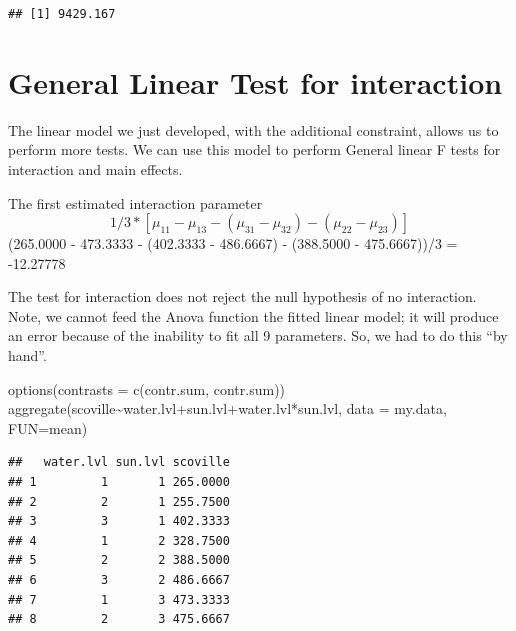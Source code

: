\documentclass[
]{book}
\newenvironment{Shaded}{\begin{snugshade}}{\end{snugshade}}
\newcommand{\AttributeTok}[1]{\textcolor[rgb]{0.77,0.63,0.00}{#1}}
\newcommand{\FunctionTok}[1]{\textcolor[rgb]{0.00,0.00,0.00}{#1}}
\newcommand{\NormalTok}[1]{#1}
\newcommand{\SpecialCharTok}[1]{\textcolor[rgb]{0.00,0.00,0.00}{#1}}
\newcommand{\StringTok}[1]{\textcolor[rgb]{0.31,0.60,0.02}{#1}}
\begin{document}
\begin{verbatim}
## [1] 9429.167
\end{verbatim}

\hypertarget{general-linear-test-for-interaction}{%
\section{General Linear Test for interaction}\label{general-linear-test-for-interaction}}

The linear model we just developed, with the additional constraint, allows us to perform more tests. We can use this model to perform General linear F tests for interaction and main effects.

The first estimated interaction parameter
\[1/3 * [\mu_{11} - \mu_{13} - (\mu_{31}-\mu_{32}) - (\mu_{22} - \mu_{23})]\]
(265.0000 - 473.3333 - (402.3333 - 486.6667) - (388.5000 - 475.6667))/3
= -12.27778

The test for interaction does not reject the null hypothesis of no interaction.
Note, we cannot feed the Anova function the fitted linear model; it will produce an error because of the inability to fit all 9 parameters. So, we had to do this ``by hand''.

\begin{Shaded}
\begin{Highlighting}[]
\FunctionTok{options}\NormalTok{(}\AttributeTok{contrasts =} \FunctionTok{c}\NormalTok{(}\StringTok{\textquotesingle{}contr.sum\textquotesingle{}}\NormalTok{, }\StringTok{\textquotesingle{}contr.sum\textquotesingle{}}\NormalTok{))}
\FunctionTok{aggregate}\NormalTok{(scoville}\SpecialCharTok{\textasciitilde{}}\NormalTok{water.lvl}\SpecialCharTok{+}\NormalTok{sun.lvl}\SpecialCharTok{+}\NormalTok{water.lvl}\SpecialCharTok{*}\NormalTok{sun.lvl, }\AttributeTok{data =}\NormalTok{ my.data, }\AttributeTok{FUN=}\NormalTok{mean)}
\end{Highlighting}
\end{Shaded}

\begin{verbatim}
##   water.lvl sun.lvl scoville
## 1         1       1 265.0000
## 2         2       1 255.7500
## 3         3       1 402.3333
## 4         1       2 328.7500
## 5         2       2 388.5000
## 6         3       2 486.6667
## 7         1       3 473.3333
## 8         2       3 475.6667
\end{verbatim}
\end{document}
